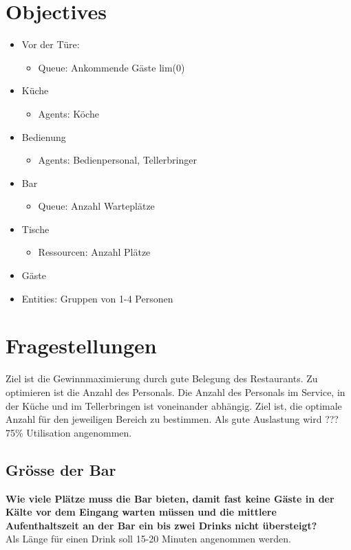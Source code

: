 \documentclass[ngerman,a4paper,12pt]{scrreprt}
\begin{document}
\section{Objectives}
	\begin{itemize}
		\item Vor der Türe:
			\begin{itemize}
				\item Queue: Ankommende Gäste lim(0)
			\end{itemize}
		\item Küche
			\begin{itemize}
				\item Agents: Köche
			\end{itemize}
		\item Bedienung
			\begin{itemize}
				\item Agents: Bedienpersonal, Tellerbringer
			\end{itemize}
		\item Bar
			\begin{itemize}
				\item Queue: Anzahl Warteplätze
			\end{itemize}
		\item Tische
			\begin{itemize}
				\item Ressourcen: Anzahl Plätze
			\end{itemize}
	\end{itemize}
	\begin{itemize}
		\item Gäste
		\item Entities: Gruppen von 1-4 Personen 
	\end{itemize}



\section{Fragestellungen}
	Ziel ist die Gewinnmaximierung durch gute Belegung des Restaurants. Zu optimieren ist die Anzahl des Personals. Die Anzahl des Personals im Service, in der Küche und im Tellerbringen ist voneinander abhängig. Ziel ist, die optimale Anzahl für den jeweiligen Bereich zu bestimmen. Als gute Auslastung wird ??? 75\% Utilisation angenommen.
	
	\subsection{Grösse der Bar}
		\textbf{Wie viele Plätze muss die Bar bieten, damit fast keine Gäste in der Kälte vor dem Eingang warten müssen und die mittlere Aufenthaltszeit an der Bar ein bis zwei Drinks nicht übersteigt?} \\
		Als Länge für einen Drink soll 15-20 Minuten angenommen werden.
\end{document}

